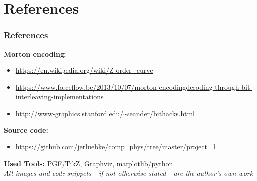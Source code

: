 \section{References}
\begin{frame}
    \frametitle{References}
    \textbf{Morton encoding:}
    \begin{itemize}
    \item \url{https://en.wikipedia.org/wiki/Z-order_curve} \\
    \item
        \url{https://www.forceflow.be/2013/10/07/morton-encodingdecoding-through-bit-interleaving-implementations}
        \\
    \item \url{http://www-graphics.stanford.edu/~seander/bithacks.html}
    \end{itemize}
    \textbf{Source code:}
    \begin{itemize}
        \item \url{https://github.com/jerluebke/comp_phys/tree/master/project_1}
    \end{itemize}
    \textbf{Used Tools:}
    \href{https://sourceforge.net/projects/pgf/}{PGF/TikZ},
    \href{https://graphviz.gitlab.io/}{Graphviz},
    \href{https://matplotlib.org/}{matplotlib/python}
    \vspace*{\baselineskip} \\
    {\footnotesize\textit{All images and code snippets - if not otherwise stated - are
    the author's own work}}
\end{frame}

